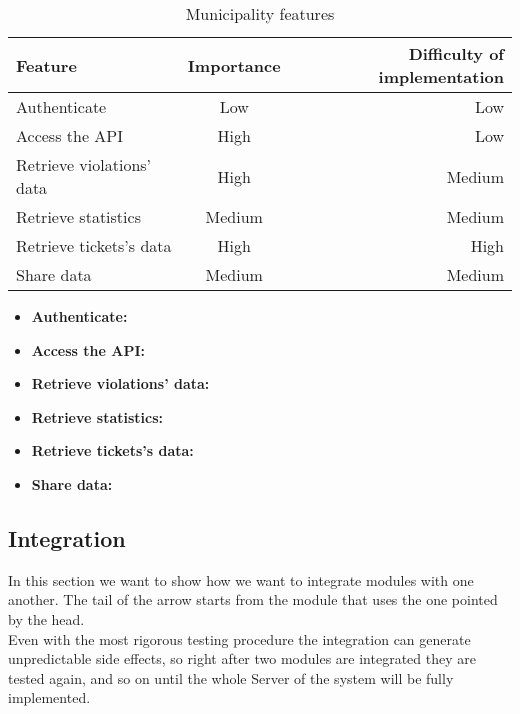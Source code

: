         \begin{table}[h!]
            \begin{center}
            
            \begin{tabular}{l|c|r} %
                \textbf{Feature} & \textbf{Importance} & \textbf{Difficulty of implementation}\\
                
                \hline
                Authenticate & Low & Low\\
                Access the API & High & Low\\
                Retrieve violations' data & High & Medium\\
                Retrieve statistics & Medium & Medium\\
                Retrieve tickets's data & High & High\\
                Share data & Medium & Medium\\

            \end{tabular}
            \caption{Municipality features}
            \label{tab:table1}
            \end{center}
        \end{table}

        \begin{itemize}
            \item \textbf{Authenticate:} 
            \item \textbf{Access the API:}
            \item \textbf{Retrieve violations' data:}
            \item \textbf{Retrieve statistics:}
            \item \textbf{Retrieve tickets's data:}
            \item \textbf{Share data:}
        \end{itemize}

    \subsection{Integration}

        In this section we want to show how we want to integrate modules with one another. The tail of the arrow starts from the module 
        that uses the one pointed by the head.\\
        Even with the most rigorous testing procedure the integration can generate unpredictable side effects, so right after two modules 
        are integrated they are tested again, and so on until the whole Server of the system will be fully implemented.

